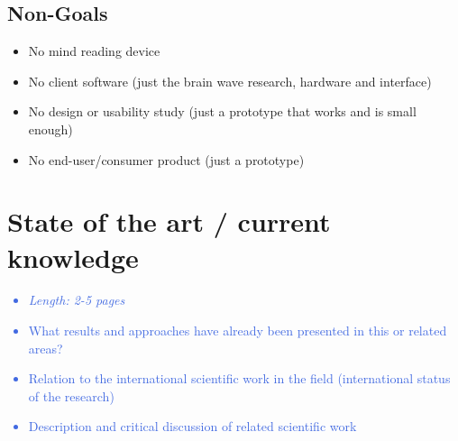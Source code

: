 \documentclass[a4paper,11pt]{article}
\providecommand*{\note}[1]{\small \textcolor{RoyalBlue}{\begin{minipage}{\textwidth}{#1}\end{minipage}}}
\begin{document}
\subsection{Non-Goals}
\begin{itemize}
	\item No mind reading device
	\item No client software (just the brain wave research, hardware and interface)
	\item No design or usability study (just a prototype that works and is small enough)
	\item No end-user/consumer product (just a prototype)
\end{itemize}



\section{State of the art / current knowledge}
\label{sect:star}

\note{
\begin{itemize}
\item {\em Length: 2-5 pages}
\item What results and approaches have already been presented in this or related areas?
\item Relation to the international scientific work in the field (international status of the research)
\item Description and critical discussion of related scientific work
\end{itemize}
}
\end{document}
